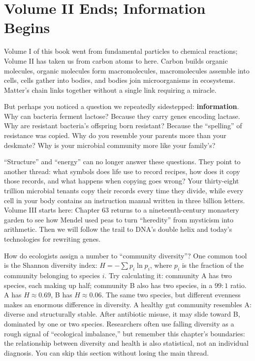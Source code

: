 \section{Volume II Ends; Information Begins}

Volume I of this book went from fundamental particles to chemical reactions; Volume II has taken us from carbon atoms to here. Carbon builds organic molecules, organic molecules form macromolecules, macromolecules assemble into cells, cells gather into bodies, and bodies join microorganisms in ecosystems. Matter's chain links together without a single link requiring a miracle.

But perhaps you noticed a question we repeatedly sidestepped: \textbf{information}. Why can bacteria ferment lactose? Because they carry genes encoding lactase. Why are resistant bacteria's offspring born resistant? Because the ``spelling'' of resistance was copied. Why do you resemble your parents more than your deskmate? Why is your microbial community more like your family's?

``Structure'' and ``energy'' can no longer answer these questions. They point to another thread: what symbols does life use to record recipes, how does it copy those records, and what happens when copying goes wrong? Your thirty-eight trillion microbial tenants copy their records every time they divide, while every cell in your body contains an instruction manual written in three billion letters. Volume III starts here: Chapter 63 returns to a nineteenth-century monastery garden to see how Mendel used peas to turn ``heredity'' from mysticism into arithmetic. Then we will follow the trail to DNA's double helix and today's technologies for rewriting genes.

\begin{tiaozhan}
How do ecologists assign a number to ``community diversity''? One common tool is the Shannon diversity index: $H=-\sum p_i \ln p_i$, where $p_i$ is the fraction of the community belonging to species $i$. Try calculating it: community A has two species, each making up half; community B also has two species, in a $99:1$ ratio. A has $H\approx 0.69$, B has $H\approx 0.06$. The same two species, but different evenness makes an enormous difference in diversity. A healthy gut community resembles A: diverse and structurally stable. After antibiotic misuse, it may slide toward B, dominated by one or two species. Researchers often use falling diversity as a rough signal of ``ecological imbalance,'' but remember this chapter's boundaries: the relationship between diversity and health is also statistical, not an individual diagnosis. You can skip this section without losing the main thread.
\end{tiaozhan}

